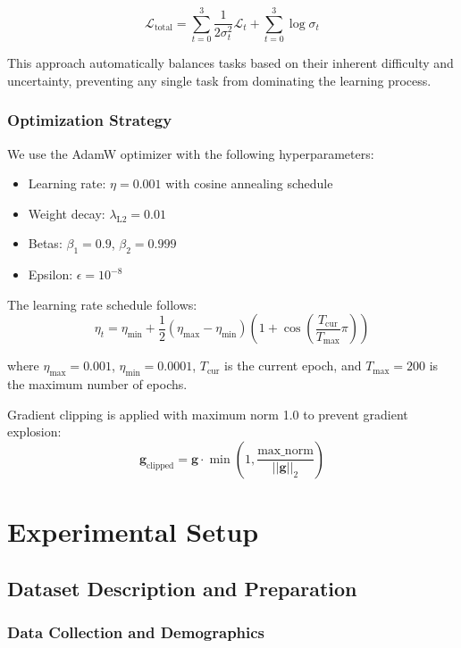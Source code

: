 \documentclass[10pt,journal,compsoc]{IEEEtran}
\begin{document}
\begin{equation}
\mathcal{L}_{\text{total}} = \sum_{t=0}^{3} \frac{1}{2\sigma_t^2} \mathcal{L}_t + \sum_{t=0}^{3} \log \sigma_t
\end{equation}

This approach automatically balances tasks based on their inherent difficulty and uncertainty, preventing any single task from dominating the learning process.

\subsubsection{Optimization Strategy}

We use the AdamW optimizer with the following hyperparameters:
\begin{itemize}
\item Learning rate: $\eta = 0.001$ with cosine annealing schedule
\item Weight decay: $\lambda_{\text{L2}} = 0.01$
\item Betas: $\beta_1 = 0.9$, $\beta_2 = 0.999$
\item Epsilon: $\epsilon = 10^{-8}$
\end{itemize}

The learning rate schedule follows:
\begin{equation}
\eta_t = \eta_{\min} + \frac{1}{2}(\eta_{\max} - \eta_{\min})(1 + \cos(\frac{T_{\text{cur}}}{T_{\max}} \pi))
\end{equation}

where $\eta_{\max} = 0.001$, $\eta_{\min} = 0.0001$, $T_{\text{cur}}$ is the current epoch, and $T_{\max} = 200$ is the maximum number of epochs.

Gradient clipping is applied with maximum norm 1.0 to prevent gradient explosion:
\begin{equation}
\mathbf{g}_{\text{clipped}} = \mathbf{g} \cdot \min\left(1, \frac{\text{max\_norm}}{||\mathbf{g}||_2}\right)
\end{equation}

\section{Experimental Setup}

\subsection{Dataset Description and Preparation}

\subsubsection{Data Collection and Demographics}
\end{document}

